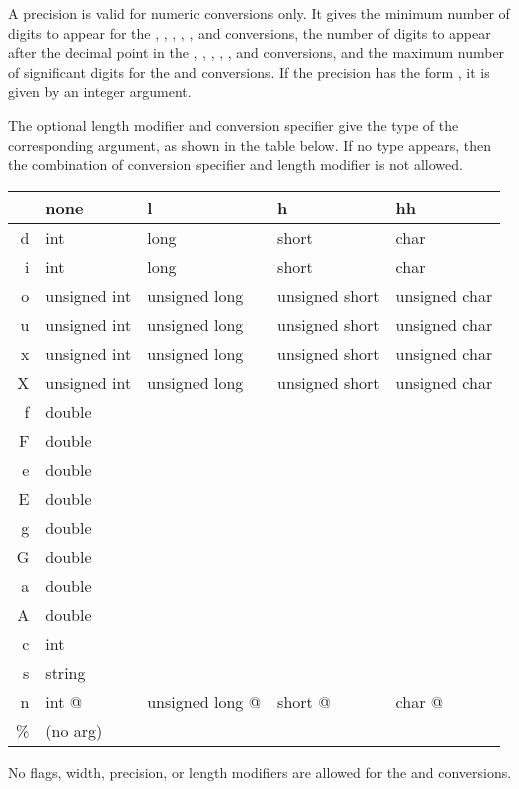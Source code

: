 A precision is valid for numeric conversions only.  It gives the minimum
number of digits to appear for the , , ,
, , and  conversions, the number of digits to
appear after the decimal point in the , , ,
, , and  conversions, and the maximum number of
significant digits for the  and  conversions.  If the
precision has the form  \code{*}, it is given by an integer
argument.

The optional length modifier and conversion specifier give the type of
the corresponding argument, as shown in the table below.  If no type
appears, then the combination of conversion specifier and length
modifier is not allowed.

\begin{tt}
\begin{tabular}{r|llll}
  & none         & l             & h              & hh\\\hline
d & int          & long          & short          & char \\
i & int          & long          & short          & char \\
o & unsigned int & unsigned long & unsigned short & unsigned char \\
u & unsigned int & unsigned long & unsigned short & unsigned char \\
x & unsigned int & unsigned long & unsigned short & unsigned char \\
X & unsigned int & unsigned long & unsigned short & unsigned char \\
f & double \\
F & double \\
e & double \\
E & double \\
g & double \\
G & double \\
a & double \\
A & double \\
c & int \\
s & string \\
n & int @        & unsigned long @ & short @      & char @ \\
\% & \textrm{(no arg)}
\end{tabular}
\end{tt}

No flags, width, precision, or length modifiers are allowed for the
 and \code{\%} conversions.

